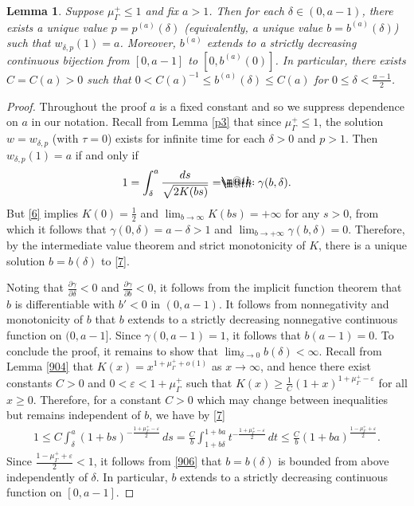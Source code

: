 \documentclass[12pt]{article}
\makeatletter
\numberwithin{equation}{section}
\theoremstyle{plain}
\newtheorem{lem}[thm]{Lemma}
\theoremstyle{definition}
\newcommand{\ep}{\varepsilon}
\newcommand*{\eqdef}{=\mathrel{\rlap{%
			\raisebox{0.3ex}{$\m@th\cdot$}}%
		\raisebox{-0.3ex}{$\m@th\cdot$}}%
}
\makeatother
\begin{document}
\begin{lem}\label{702}
	Suppose $\mu_\Gamma^+ \leq 1$ and fix $a>1$. Then for each $\delta\in(0,a-1)$, there exists a unique value $p = p^{(a)}(\delta)$ (equivalently, a unique value $b = b^{(a)}(\delta)$) such that $w_{\delta,p}(1) = a$. Moreover, $b^{(a)}$ extends to a strictly decreasing continuous bijection from $[0,a-1]$ to $[0,b^{(a)}(0)]$. In particular, there exists $C = C(a)>0$ such that $0< C(a)^{-1} \leq b^{(a)}(\delta) \leq C(a)$ for $0\leq \delta<\frac{a-1}{2}$.
\end{lem}
\begin{proof}
	Throughout the proof $a$ is a fixed constant and so we suppress dependence on $a$ in our notation. Recall from Lemma \ref{p3} that since $\mu_\Gamma^+ \leq 1$, the solution $w=w_{\delta,p}$ (with $\tau=0$) exists for infinite time for each $\delta>0$ and $p>1$. Then $w_{\delta,p}(1) = a$ if and only if 
	\begin{align}\label{7}
	1 = \int_\delta^{a} \frac{ds}{\sqrt{2K(bs)}} \eqdef \gamma(b,\delta). 
	\end{align}
	But \eqref{6} implies $K(0) = \frac{1}{2}$ and $\lim_{b\rightarrow\infty} K(bs) = +\infty$ for any $s>0$, from which it follows that $\gamma(0,\delta) = a - \delta> 1$ and $\lim_{b\rightarrow+\infty}\gamma(b,\delta) = 0$. Therefore, by the intermediate value theorem and strict monotonicity of $K$, there is a unique solution $b=b(\delta)$ to \eqref{7}.\medskip 
	
	Noting that $\frac{\partial\gamma}{\partial\delta}<0$ and $\frac{\partial\gamma}{\partial b}<0$, it follows from the implicit function theorem that $b$ is differentiable with $b'<0$ in $(0,a-1)$. It follows from nonnegativity and monotonicity of $b$ that $b$ extends to a strictly decreasing nonnegative continuous function on $(0,a-1]$. Since $\gamma(0,a-1) = 1$, it follows that $b(a-1) = 0$. To conclude the proof, it remains to show that $\lim_{\delta\rightarrow 0} b(\delta)<\infty$. Recall from Lemma \ref{904} that $K(x) = x^{1+\mu_\Gamma^+ + o(1)}$ as $x\rightarrow\infty$, and hence there exist constants $C>0$ and $0<\ep<1+\mu_\Gamma^+$ such that $K(x) \geq \frac{1}{C}(1+x)^{1+\mu_\Gamma^+ - \ep}$ for all $x \geq 0$. Therefore, for a constant $C>0$ which may change between inequalities but remains independent of $b$, we have by \eqref{7}
	\begin{align}\label{906}
	1 \leq C\int_\delta^a (1+bs)^{-\frac{1+\mu_\Gamma^+-\ep}{2}}\,ds = \frac{C}{b}\int_{1+b\delta}^{1+ba} t^{-\frac{1+\mu_\Gamma^+-\ep}{2}}\,dt \leq \frac{C}{b}(1+ba)^{\frac{1-\mu_\Gamma^+ +\ep}{2}}. 
	\end{align}
	Since $\frac{1-\mu_\Gamma^+ +\ep}{2}<1$, it follows from \eqref{906} that $b=b(\delta)$ is bounded from above independently of $\delta$. In particular, $b$ extends to a strictly decreasing continuous function on $[0,a-1]$. 
\end{proof}
\end{document}
